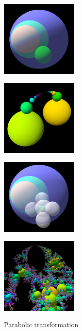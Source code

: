\begin{figure}[h!tbp]
  \begin{minipage}{0.24\hsize}
   \center
   \includegraphics[width=1.5in, height=1.5in, keepaspectratio]{../img/klein/3diis/parabolicOneGen.pdf}
   \label{fig:parabolicGen3d}
  \end{minipage}
  \hspace*{\fill}
  \begin{minipage}{0.24\hsize}
   \center
   \includegraphics[width=1.5in, height=1.5in, keepaspectratio]{../img/klein/3diis/parabolicOneOrb.pdf}
   \label{fig:parabolicOrb3d}
  \end{minipage}
  \hspace*{\fill}
  \begin{minipage}{0.24\hsize}
   \center
   \includegraphics[width=1.5in, height=1.5in, keepaspectratio]{../img/klein/3diis/parabolicGen.pdf}
   \label{fig:compLoxoGen}
  \end{minipage}
 \hspace*{\fill}
 \begin{minipage}{0.24\hsize}
  \center
  \includegraphics[width=1.5in, height=1.5in, keepaspectratio]{../img/klein/3diis/parabolicOrb.pdf}
   \label{fig:compLoxoOrb}
 \end{minipage}
 \hspace*{\fill}
  \caption{Parabolic transformation}
 \label{fig:compLoxo}
\end{figure}

